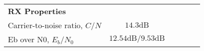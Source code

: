 \begin{table}[htbp]
\begin{tabular}{lccccr}
    \rowcolor[rgb]{ 0,  0,  0} \textcolor[rgb]{ 1,  1,  1}{\textbf{RX Properties}}	& \textcolor[rgb]{ 1,  1,  1}{\textbf{}} 		\\
    Carrier-to-noise ratio, $C/N$ 					& $14.3\text{dB}$										\\
    Eb over N0, $E_b/N_0$ 					& $12.54 \text{dB} / 9.53 \text{dB}$					\\
    \end{tabular}
  \label{tab:link_budget}

\end{table}
